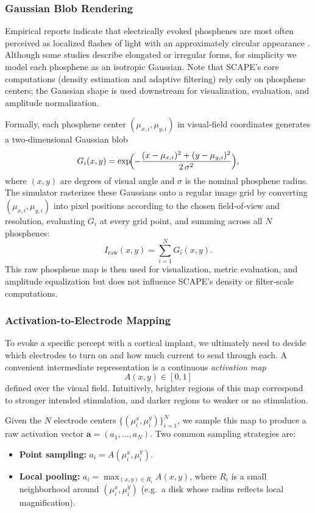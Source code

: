 \subsubsection{Gaussian Blob Rendering}
Empirical reports indicate that electrically evoked phosphenes are most often perceived as localized flashes of light with an approximately circular appearance \cite{vanderGrinten2024}. Although some studies describe elongated or irregular forms, for simplicity we model each phosphene as an isotropic Gaussian. Note that SCAPE’s core computations (density estimation and adaptive filtering) rely only on phosphene centers; the Gaussian shape is used downstream for visualization, evaluation, and amplitude normalization.

Formally, each phosphene center \((\mu_{x,i},\mu_{y,i})\) in visual‐field coordinates generates a two‐dimensional Gaussian blob
\[
G_i(x,y)
=
\exp\!\Bigl(-\frac{(x-\mu_{x,i})^2 + (y-\mu_{y,i})^2}{2\,\sigma^2}\Bigr),
\]
where \((x,y)\) are degrees of visual angle and \(\sigma\) is the nominal phosphene radius. The simulator rasterizes these Gaussians onto a regular image grid by converting \((\mu_{x,i},\mu_{y,i})\) into pixel positions according to the chosen field‐of‐view and resolution, evaluating \(G_i\) at every grid point, and summing across all \(N\) phosphenes:
\[
I_{\mathrm{raw}}(x,y)
=
\sum_{i=1}^{N} G_i(x,y).
\]
This raw phosphene map is then used for visualization, metric evaluation, and amplitude equalization but does not influence SCAPE’s density or filter‐scale computations.


\subsubsection{Activation-to-Electrode Mapping}

To evoke a specific percept with a cortical implant, we ultimately need to decide which electrodes to turn on and how much current to send through each.  A convenient intermediate representation is a continuous \emph{activation map} 
\[
  A(x,y)\in[0,1]
\]
defined over the visual field.  Intuitively, brighter regions of this map correspond to stronger intended stimulation, and darker regions to weaker or no stimulation.  

Given the $N$ electrode centers \(\{(\mu_i^x,\mu_i^y)\}_{i=1}^N\), we sample this map to produce a raw activation vector \(\mathbf{a}=(a_1,\dots,a_N)\).  Two common sampling strategies are:

\begin{itemize}
  \item \textbf{Point sampling:}  
    \(\displaystyle a_i = A(\mu_i^x,\mu_i^y)\).
  \item \textbf{Local pooling:}  
    \(\displaystyle a_i = \max_{(x,y)\in R_i} A(x,y)\), where \(R_i\) is a small neighborhood around \((\mu_i^x,\mu_i^y)\) (e.g.\ a disk whose radius reflects local magnification).
\end{itemize}

